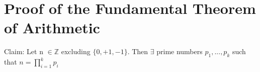 \documentclass{article}
\begin{document}
\begin{comment}
\pagebreak
\section{Proof of the Extended Euclidean Algorithm}
Claim: If d divides a, d dives b, and $d = ax+by$ for some integers x and y, the d = gcd(a,b).

Proof: Let there exist integers a, b,x,y, and d, such that d divides a, d divides b, and d = ax+by. We want to show that d = gcd(a,b) With d dividing both a and b, d cannot exceed the greatest common divisor which means that $d \leq gcd(a,b)$. Also, since the gcd(a,b) is a common factor of a and b, it must also divide $ax+by$. Using this we get $gcd(a,b) \leq d$. After finding the facts that $d \leq gcd(a,b)$ and $gcd(a,b) \leq d$ we can conclude that $d = gcd(a,b)$.

QED

\end{comment}
\pagebreak
\section{Proof of the Fundamental Theorem of Arithmetic}
Claim: Let n $\in \mathbb{Z}$ excluding $\{0,+1,-1\}$. Then $\exists$ prime numbers $p_1, ..., p_k$ such that $ n = \prod_{i=1}^{k} p_i$
\end{document}
